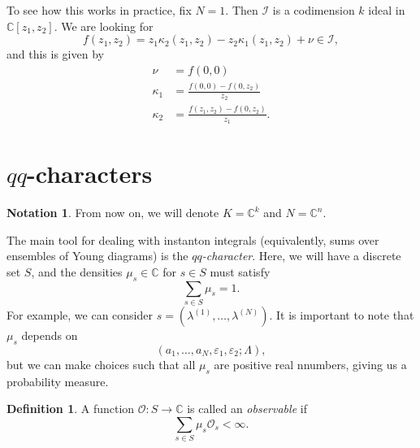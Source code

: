 \documentclass[leqno, openany]{memoir}
\theoremstyle{definition}
\newtheorem{defn}[thm]{Definition}
\newtheorem{notn}[thm]{Notation}
\theoremstyle{remark}
\theoremstyle{plain}
\theoremstyle{definition}
\theoremstyle{remark}
\newcommand{\C}{\mathbb{C}}
\newcommand{\ep}{\varepsilon}
\newcommand{\mc}[1]{\mathcal{#1}}
\begin{document}
To see how this works in practice, fix $N=1$. Then $\mc{I}$ is a codimension $k$ ideal in $\C[z_1, z_2]$. We are looking for 
\[ f(z_1, z_2) = z_1 \kappa_2(z_1, z_2) - z_2 \kappa_1(z_1, z_2) + \nu \in \mc{I}, \]
and this is given by
\begin{align*}
    \nu &= f(0,0) \\
    \kappa_1 &=  \frac{f(0,0) - f(0,z_2)}{z_2} \\
    \kappa_2 &= \frac{f(z_1, z_2) - f(0, z_2)}{z_1}.
\end{align*}

\section{$qq$-characters}%
\label{sec:qqcharacters}

\begin{notn}
    From now on, we will denote $K = \C^k$ and $N = \C^n$.
\end{notn}


The main tool for dealing with instanton integrals (equivalently, sums over ensembles of Young diagrams) is the \textit{$qq$-character}. Here, we will have a discrete set $S$, and the densities $\mu_s \in \C$ for $s \in S$ must satisfy
\[ \sum_{s \in S} \mu_s = 1. \]
For example, we can consider $s = (\lambda^{(1)}, \ldots, \lambda^{(N)})$. It is important to note that $\mu_s$ depends on
\[ (a_1, \ldots, a_N, \ep_1, \ep_2; \Lambda), \]
but we can make choices such that all $\mu_s$ are positive real nnumbers, giving us a probability measure.

\begin{defn}
    A function $\mc{O} \colon S \to \C$ is called an \textit{observable} if 
    \[ \sum_{s \in S} \mu_s \mc{O}_s < \infty. \]
\end{defn}
\end{document}
